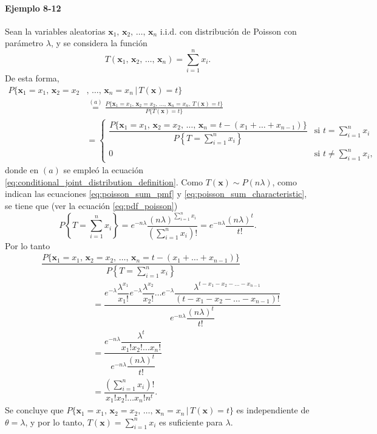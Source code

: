 \documentclass[a4paper]{report}
\newcommand{\x}{\mathbf{x}}
\begin{document}
\paragraph{Ejemplo 8-12} Sean la variables aleatorias \(\x_1,\,\x_2,\,\dots,\,\x_n\) i.i.d. con distribución de Poisson con parámetro \(\lambda\), y se considera la función 
\[
 T(\x_1,\,\x_2,\,\dots,\,\x_n)=\sum_{i=1}^nx_i.
\]
De esta forma,
\begin{align*}
 P\{\x_1=x_1,\,\x_2=x_2&,\,\dots,\,\x_n=x_n\,|\,T(\x)=t\}\\
  &\overset{(a)}{=}\frac{P\{\x_1=x_1,\,\x_2=x_2,\,\dots,\,\x_n=x_n,\,T(\x)=t\}}{P\{T(\x)=t\}}\\
  &=\left\{\begin{array}{ll}
      \dfrac{P\{\x_1=x_1,\,\x_2=x_2,\,\dots,\,\x_n=t-(x_1+\dots+x_{n-1})\}}{\displaystyle P\left\{T=\sum_{i=1}^nx_i\right\}} &\displaystyle\textrm{si }t=\sum_{i=1}^nx_i\\
      0 & \displaystyle\textrm{si }t\neq\sum_{i=1}^nx_i,
    \end{array}\right. 
\end{align*}
donde en \((a)\) se empleó la ecuación \ref{eq:conditional_joint_distribution_definition}.
Como \(T(\x)\sim P(n\lambda)\), como indican las ecuaciones \ref{eq:poisson_sum_pmf} y \ref{eq:poisson_sum_characteristic}, se tiene que (ver la ecuación \ref{eq:pdf_poisson})
\[
 P\left\{T=\sum_{i=1}^nx_i\right\}=e^{-n\lambda}\frac{(n\lambda)^{\sum_{i=1}^nx_i}}{\left(\displaystyle\sum_{i=1}^nx_i\right)!}=e^{-n\lambda}\frac{(n\lambda)^t}{t!}.
\]
Por lo tanto
\begin{align*}
 &\dfrac{P\{\x_1=x_1,\,\x_2=x_2,\,\dots,\,\x_n=t-(x_1+\dots+x_{n-1})\}}{\displaystyle P\left\{T=\sum_{i=1}^nx_i\right\}}\\
 &\qquad\qquad\qquad=\dfrac{e^{-\lambda}\dfrac{\lambda^{x_1}}{x_1!}e^{-\lambda}\dfrac{\lambda^{x_2}}{x_2!}\dots e^{-\lambda}\dfrac{\lambda^{t-x_1-x_2-\dots-x_{n-1}}}{(t-x_1-x_2-\dots-x_{n-1})!}}{e^{-n\lambda}\dfrac{(n\lambda)^t}{t!}}\\
 &\qquad\qquad\qquad=\dfrac{e^{-n\lambda}\dfrac{\lambda^t}{x_1!x_2!\dots x_n!}}{{e^{-n\lambda}\dfrac{(n\lambda)^t}{t!}}}\\
 &\qquad\qquad\qquad=\dfrac{\displaystyle\left(\displaystyle\sum_{i=1}^nx_i\right)!}{x_1!x_2!\dots x_n!n^t}.
\end{align*}
Se concluye que \(P\{\x_1=x_1,\,\x_2=x_2,\,\dots,\,\x_n=x_n\,|\,T(\x)=t\}\) es independiente de \(\theta=\lambda\), y por lo tanto, \(T(\x)=\sum_{i=1}^nx_i\) es suficiente para \(\lambda\).







\end{document}
